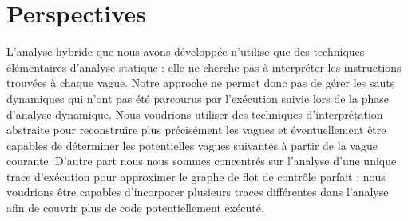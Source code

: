 % 
% 







\section*{Perspectives}
L'analyse hybride que nous avons développée n'utilise que des techniques élémentaires d'analyse statique :
elle ne cherche pas à interpréter les instructions trouvées à chaque vague. 
Notre approche ne permet donc pas de gérer les sauts dynamiques qui n'ont pas été parcourus par l'exécution suivie lors de la phase d'analyse dynamique.
Nous voudrions utiliser des techniques d’interprétation abstraite pour reconstruire plus précisément les vagues et éventuellement être capables de déterminer les potentielles vagues suivantes à partir de la vague courante.
D'autre part nous nous sommes concentrés sur l'analyse d'une unique trace d'exécution pour approximer le graphe de flot de contrôle parfait : nous voudrions être capables d'incorporer plusieurs traces différentes dans l'analyse afin de couvrir plus de code potentiellement exécuté.

